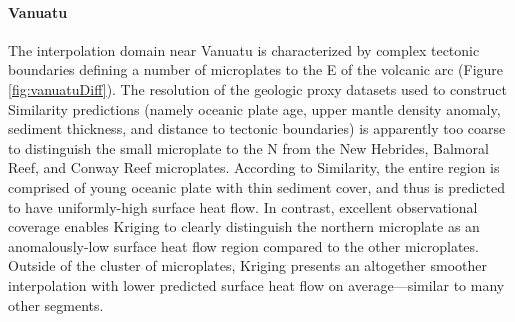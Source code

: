 \hypertarget{vanuatu}{%
\paragraph{Vanuatu}\label{vanuatu}}

The interpolation domain near Vanuatu is characterized by complex tectonic boundaries defining a number of microplates to the E of the volcanic arc (Figure \ref{fig:vanuatuDiff}). The resolution of the geologic proxy datasets used to construct Similarity predictions (namely oceanic plate age, upper mantle density anomaly, sediment thickness, and distance to tectonic boundaries) is apparently too coarse to distinguish the small microplate to the N from the New Hebrides, Balmoral Reef, and Conway Reef microplates. According to Similarity, the entire region is comprised of young oceanic plate with thin sediment cover, and thus is predicted to have uniformly-high surface heat flow. In contrast, excellent observational coverage enables Kriging to clearly distinguish the northern microplate as an anomalously-low surface heat flow region compared to the other microplates. Outside of the cluster of microplates, Kriging presents an altogether smoother interpolation with lower predicted surface heat flow on average---similar to many other segments.



